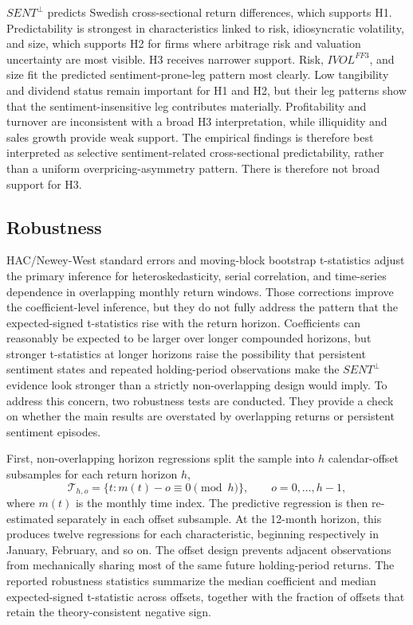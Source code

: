 \documentclass[11pt]{article}
\newcommand{\var}[1]{\ensuremath{#1}}
\begin{document}
\var{SENT^{\perp}} predicts Swedish cross-sectional return differences, which supports H1. Predictability is strongest in characteristics linked to risk, idiosyncratic volatility, and size, which supports H2 for firms where arbitrage risk and valuation uncertainty are most visible. H3 receives narrower support. Risk, \var{IVOL^{FF3}}, and size fit the predicted sentiment-prone-leg pattern most clearly. Low tangibility and dividend status remain important for H1 and H2, but their leg patterns show that the sentiment-insensitive leg contributes materially. Profitability and turnover are inconsistent with a broad H3 interpretation, while illiquidity and sales growth provide weak support. The empirical findings is therefore best interpreted as selective sentiment-related cross-sectional predictability, rather than a uniform overpricing-asymmetry pattern. There is therefore not broad support for H3.

\subsection{Robustness}
HAC/Newey-West standard errors and moving-block bootstrap t-statistics adjust the primary inference for heteroskedasticity, serial correlation, and time-series dependence in overlapping monthly return windows. Those corrections improve the coefficient-level inference, but they do not fully address the pattern that the expected-signed t-statistics rise with the return horizon. Coefficients can reasonably be expected to be larger over longer compounded horizons, but stronger t-statistics at longer horizons raise the possibility that persistent sentiment states and repeated holding-period observations make the \var{SENT^{\perp}} evidence look stronger than a strictly non-overlapping design would imply. To address this concern, two robustness tests are conducted. They provide a check on whether the main results are overstated by overlapping returns or persistent sentiment episodes.

First, non-overlapping horizon regressions split the sample into \var{h} calendar-offset subsamples for each return horizon \var{h},
\begin{equation}
    \mathcal{T}_{h,o}=\{t: m(t)-o \equiv 0 \pmod h\}, \qquad o=0,\ldots,h-1,
\end{equation}
where \var{m(t)} is the monthly time index. The predictive regression is then re-estimated separately in each offset subsample. At the 12-month horizon, this produces twelve regressions for each characteristic, beginning respectively in January, February, and so on. The offset design prevents adjacent observations from mechanically sharing most of the same future holding-period returns. The reported robustness statistics summarize the median coefficient and median expected-signed t-statistic across offsets, together with the fraction of offsets that retain the theory-consistent negative sign.
\end{document}
